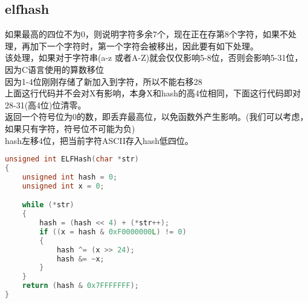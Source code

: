 \subsection{elfhash}
如果最高的四位不为0，则说明字符多余7个，现在正在存第8个字符，如果不处理，再加下一个字符时，第一个字符会被移出，因此要有如下处理。 \\
该处理，如果对于字符串(a-z 或者A-Z)就会仅仅影响5-8位，否则会影响5-31位，因为C语言使用的算数移位 \\
因为1-4位刚刚存储了新加入到字符，所以不能右移28 \\
上面这行代码并不会对X有影响，本身X和hash的高4位相同，下面这行代码即对28-31(高4位)位清零。\\
返回一个符号位为0的数，即丢弃最高位，以免函数外产生影响。(我们可以考虑，如果只有字符，符号位不可能为负)\\
hash左移4位，把当前字符ASCII存入hash低四位。 \\
		\begin{lstlisting}[language=c++]
unsigned int ELFHash(char *str)
{
	unsigned int hash = 0;
	unsigned int x = 0;

	while (*str)
	{
		hash = (hash << 4) + (*str++); 
		if ((x = hash & 0xF0000000L) != 0)
		{
			hash ^= (x >> 24);	
			hash &= ~x;
		}
	}
	return (hash & 0x7FFFFFFF);
}
		\end{lstlisting}
